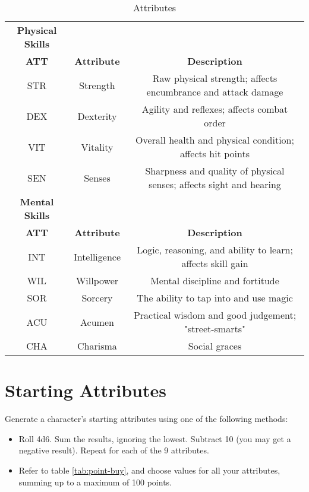 
\begin{table}[h!]
    \begin{tabular}{c c c}
        \bfseries{Physical Skills} \\
        \bfseries{ATT} & \bfseries{Attribute} & \bfseries{Description} \\
        STR & Strength & Raw physical strength; affects encumbrance and attack damage \\
        DEX & Dexterity & Agility and reflexes; affects combat order \\
        VIT & Vitality & Overall health and physical condition; affects hit points \\
        SEN & Senses & Sharpness and quality of physical senses; affects sight and hearing \\
        \bfseries{Mental Skills} \\
        \bfseries{ATT} & \bfseries{Attribute} & \bfseries{Description} \\
        INT & Intelligence & Logic, reasoning, and ability to learn; affects skill gain \\
        WIL & Willpower & Mental discipline and fortitude \\
        SOR & Sorcery & The ability to tap into and use magic \\
        ACU & Acumen & Practical wisdom and good judgement; "street-smarts" \\
        CHA & Charisma & Social graces \\
    \end{tabular}
    \label{tab:attributes}
    \caption{Attributes}
\end{table}

\section{Starting Attributes}
Generate a character's starting attributes using one of the following methods:
\begin{itemize}
    \item Roll 4d6. Sum the results, ignoring the lowest. Subtract 10 (you may
        get a negative result). Repeat for each of the 9 attributes.
    \item Refer to table \ref{tab:point-buy}, and choose values for all your
        attributes, summing up to a maximum of 100 points.
\end{itemize}

